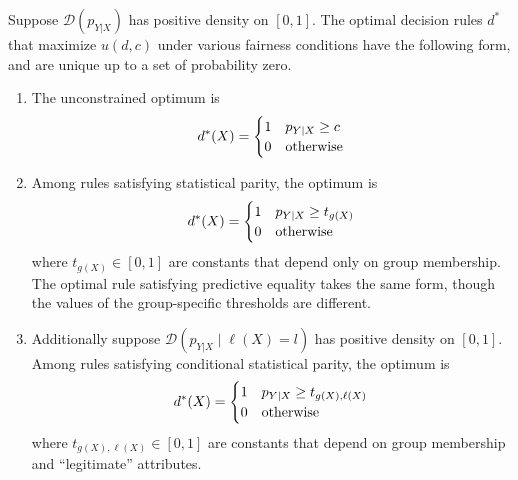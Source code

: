 \documentclass[sigconf]{acmart}
\begin{document}
\begin{theorem}
\label{thm:mother}
Suppose $\mathcal{D}(p_{Y|X})$ has positive density on $[0,1]$. 
The optimal decision rules $d^*$ that maximize $u(d,c)$ under various fairness conditions have the following form, 
and are unique up to a set of probability zero.
\begin{enumerate}
\item The unconstrained optimum is
\begin{equation*}
d^*(X) = 
\begin{cases}
1 & p_{Y|X} \geq c \\
0 & \textnormal{otherwise}
\end{cases}
\end{equation*}
\item Among rules satisfying statistical parity, the optimum is
\begin{equation*}
d^*(X) = 
\begin{cases}
1 & p_{Y|X} \geq t_{g(X)} \\
0 & \textnormal{otherwise}
\end{cases}
\end{equation*}
where $t_{g(X)} \in [0,1]$ are constants that depend only on group membership. The optimal rule satisfying predictive equality takes the same form, though the values of the group-specific thresholds are different.
\item Additionally suppose $\mathcal{D}(p_{Y|X}\mid \ell(X)=l)$ has positive density on $[0,1]$. 
Among rules satisfying conditional statistical parity, the optimum is
\begin{equation*}
d^*(X) = 
\begin{cases}
1 & p_{Y|X} \geq t_{g(X), \ell(X)} \\
0 & \textnormal{otherwise}
\end{cases}
\end{equation*}
where $t_{g(X),\ell(X)} \in [0,1]$ are constants that depend on group membership and ``legitimate'' attributes.
\end{enumerate}
\end{theorem}
\end{document}
